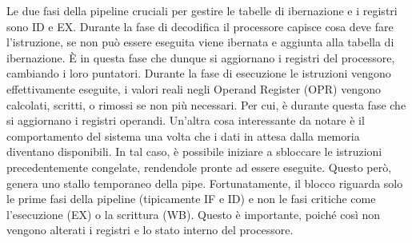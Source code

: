  Le due fasi della pipeline cruciali per gestire le tabelle di ibernazione e i registri sono ID e EX. Durante la fase di decodifica il processore capisce cosa deve fare l'istruzione, se non può essere eseguita viene ibernata e aggiunta alla tabella di ibernazione. \MakeUppercase{è} in questa fase che dunque si aggiornano i registri del processore, cambiando i loro puntatori. Durante la fase di esecuzione le istruzioni vengono effettivamente eseguite, i valori reali negli Operand Register (OPR) vengono calcolati, scritti, o rimossi se non più necessari. Per cui, è durante questa fase che si aggiornano i registri operandi. Un'altra cosa interessante da notare è il comportamento del sistema una volta che i dati in attesa dalla memoria diventano disponibili. In tal caso, è possibile iniziare a sbloccare le istruzioni precedentemente congelate, rendendole pronte ad essere eseguite. Questo però, genera uno stallo temporaneo della pipe. Fortunatamente, il blocco riguarda solo le prime fasi della pipeline (tipicamente IF e ID) e non le fasi critiche come l'esecuzione (EX) o la scrittura (WB). Questo è importante, poiché così non vengono alterati i registri e lo stato interno del processore. 
 
